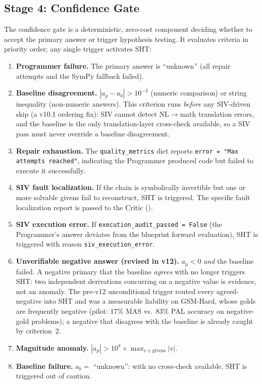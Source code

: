 \documentclass[11pt,a4paper]{article}
\begin{document}
\subsection{Stage 4: Confidence Gate}
\label{sec:confidence_gate}
The confidence gate is a deterministic, zero-cost component deciding whether to accept the primary answer or trigger hypothesis testing.
It evaluates criteria in priority order; any single trigger activates SHT:
\begin{enumerate}[leftmargin=*,itemsep=2pt]
    \item \textbf{Programmer failure.} The primary answer is ``unknown'' (all repair attempts and the SymPy fallback failed).
    \item \textbf{Baseline disagreement.} $|a_p - a_b| > 10^{-3}$ (numeric comparison) or string inequality (non-numeric answers). This criterion runs \emph{before} any SIV-driven skip (a v10.1 ordering fix): SIV cannot detect NL$\to$math translation errors, and the baseline is the only translation-layer cross-check available, so a SIV pass must never override a baseline disagreement.
    \item \textbf{Repair exhaustion.} The \texttt{quality\_metrics} dict reports \texttt{error = "Max attempts reached"}, indicating the Programmer produced code but failed to execute it successfully.
    \item \textbf{SIV fault localization.} If the chain is symbolically invertible but one or more solvable givens fail to reconstruct, SHT is triggered. The specific fault localization report is passed to the Critic ().
    \item \textbf{SIV execution error.} If \texttt{execution\_audit\_passed = False} (the Programmer's answer deviates from the blueprint forward evaluation), SHT is triggered with reason \texttt{siv\_execution\_error}.
    \item \textbf{Unverifiable negative answer (revised in v12).} $a_p < 0$ \emph{and} the baseline failed. A negative primary that the baseline \emph{agrees} with no longer triggers SHT: two independent derivations concurring on a negative value is evidence, not an anomaly. The pre-v12 unconditional trigger routed every agreed-negative into SHT and was a measurable liability on GSM-Hard, whose golds are frequently negative (pilot: 17\% MAS vs.\ 83\% PAL accuracy on negative-gold problems); a negative that disagrees with the baseline is already caught by criterion~2.
    \item \textbf{Magnitude anomaly.} $|a_p| > 10^4 \times \max_{v \in \text{givens}} |v|$.
    \item \textbf{Baseline failure.} $a_b = $ ``unknown'': with no cross-check available, SHT is triggered out of caution.
\end{enumerate}
\end{document}
